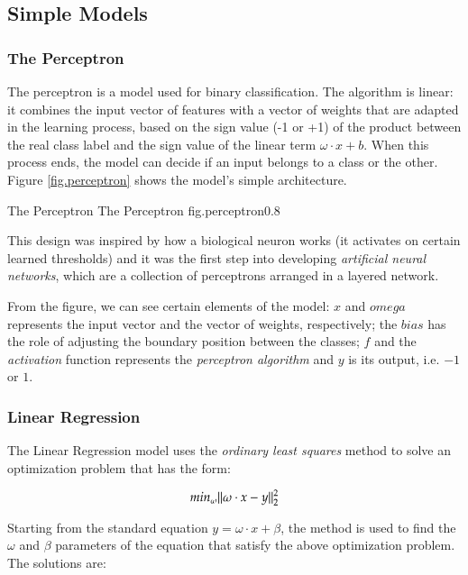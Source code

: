\subsection{Simple Models}

\subsubsection{The Perceptron}

The perceptron is a model used for binary classification. The algorithm is linear: 
it combines the input vector of features with a vector of weights that are 
adapted in the learning process, based on the sign value (-1 or +1) of the product 
between the real class label and the sign value of the linear term $\omega \cdot x + b$. 
When this process ends, the model can decide if an input belongs to a class or 
the other. Figure \ref{fig.perceptron} shows the model's simple architecture. 

%
    {The Perceptron}%
    {The Perceptron}%
    {fig.perceptron}{0.8}

This design was inspired by how a biological neuron works (it activates on 
certain learned thresholds) and it was the first step into developing 
{\it artificial neural networks}, which are a collection of perceptrons 
arranged in a layered network. 

From the figure, we can see certain elements of the model: $x$ and $omega$ 
represents the input vector and the vector of weights, respectively; the $bias$ 
has the role of adjusting the boundary position between the classes; $f$ and 
the {\it activation} function represents the {\it perceptron algorithm} 
and $y$ is its output, i.e. $-1$ or $1$. 

\subsubsection{Linear Regression}

The Linear Regression model uses the {\it ordinary least squares} method to 
solve an optimization problem that has the form:

\begin{equation}
\centering
min_{\omega} \| \omega \cdot x - y \|_{2}^{2}
\label{opt_pb}
\end{equation}

Starting from the standard equation $y = \omega \cdot x + \beta$, the method  
is used to find the $\omega$ and $\beta$ parameters of the equation that satisfy 
the above optimization problem. The solutions are:

